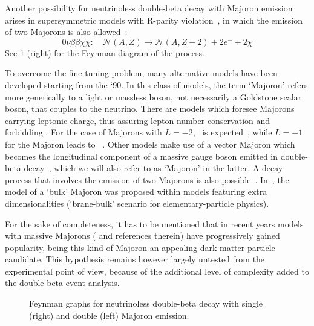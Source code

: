 Another possibility for neutrinoless double-beta decay with Majoron emission
arises in supersymmetric models with R-parity violation~\cite{Masiero1990,
Mohpatra2004}, in which the emission of two Majorons is also
allowed~\cite{Mohpatra1988}:
\[
  0\nu\beta\beta\chi\chi:\quad
    \mathcal{N}(A,Z) \longrightarrow \mathcal{N}(A,Z+2) + 2e^- + 2\chi
\]
See \cref{fig:nbb:majfeydiag} (right) for the Feynman diagram of the process.

To overcome the fine-tuning problem, many alternative models have been
developed starting from the `90. In this class of models, the term `Majoron'
refers more generically to a light or massless boson, not necessarily a
Goldstone scalar boson, that couples to the neutrino. There are models which
foresee Majorons carrying leptonic charge, thus assuring lepton number
conservation and forbidding \onbb. For the case of Majorons with $L = −2$,
\onbbx\ is expected~\cite{Burgess1993}, while $L = −1$ for the Majoron leads to
\onbbxx~\cite{Burgess1994}. Other models make use of a vector Majoron which
becomes the longitudinal component of a massive gauge boson emitted in
double-beta decay~\cite{Carone1993}, which we will also refer to as `Majoron'
in the latter. A decay process that involves the emission of two Majorons is
also possible~\cite{Bamert1995}.  In~\cite{Mohpatra2000}, the model of a `bulk'
Majoron was proposed within models featuring extra dimensionalities
(`brane-bulk' scenario for elementary-particle physics).

For the sake of completeness, it has to be mentioned that in recent years
models with massive Majorons (\cite{Blum2018} and references therein) have
progressively gained popularity, being this kind of Majoron an appealing dark
matter particle candidate. This hypothesis remains however largely untested
from the experimental point of view, because of the additional level of
complexity added to the double-beta event analysis.

\begin{figure}
  \centering%
  \caption{%
    Feynman graphs for neutrinoless double-beta decay with single (right) and
    double (left) Majoron emission. 
  }\label{fig:nbb:majfeydiag}
\end{figure}

